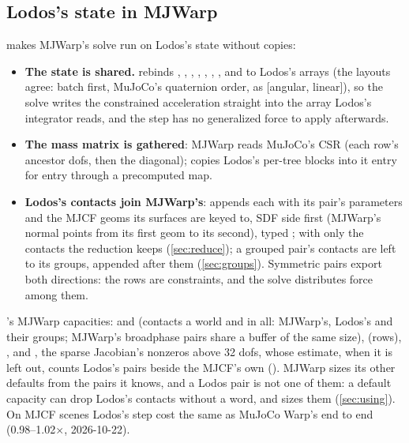 \subsection{Lodos's state in MJWarp}\label{sec:bridge}

 makes MJWarp's solve run on Lodos's state without copies:

\begin{itemize}
\item \textbf{The state is shared.}  rebinds , , , , , , ,  and  to Lodos's arrays (the layouts agree: batch first, MuJoCo's quaternion order,  as [angular, linear]), so the solve writes the constrained acceleration straight into the array Lodos's integrator reads, and the step has no generalized force to apply afterwards.
\item \textbf{The mass matrix is gathered}: MJWarp reads MuJoCo's CSR  (each row's ancestor dofs, then the diagonal);  copies Lodos's per-tree blocks into it entry for entry through a precomputed map.
\item \textbf{Lodos's contacts join MJWarp's}:  appends each with its pair's parameters and the MJCF geoms its surfaces are keyed to, SDF side first (MJWarp's normal points from its first geom to its second), typed ; with  only the contacts the reduction keeps (\cref{sec:reduce}); a grouped pair's contacts are left to its groups, appended after them (\cref{sec:groups}). Symmetric pairs export both directions: the rows are constraints, and the solve distributes force among them.
\end{itemize}

's MJWarp capacities:  and  (contacts a world and in all: MJWarp's, Lodos's and their groups; MJWarp's broadphase pairs share a buffer of the same size),  (rows), , and , the sparse Jacobian's nonzeros above 32 dofs, whose estimate, when it is left out, counts Lodos's pairs beside the MJCF's own (). MJWarp sizes its other defaults from the pairs it knows, and a Lodos pair is not one of them: a default capacity can drop Lodos's contacts without a word, and  sizes them (\cref{sec:using}). On MJCF scenes Lodos's step cost the same as MuJoCo Warp's end to end (0.98--1.02$\times$, 2026-10-22).

